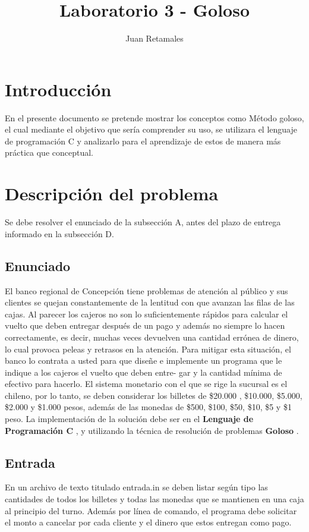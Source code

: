 \documentclass[9pt,twocolumn,twoside]{optica}
\title{Laboratorio 3 - Goloso}
\author{Juan Retamales}
\affil{Profesora: Mónica Villanueva}
\affil{Ayudante: Patricio Vargas}
\begin{document}
\maketitle

\section{Introducción}{
	\par{En}
     el presente documento se pretende mostrar los conceptos como Método goloso, el cual mediante el objetivo que sería comprender su uso, se utilizara el lenguaje de programación C y analizarlo para el aprendizaje de estos de manera más práctica que conceptual.
}

\section{Descripción del problema}
Se debe resolver el enunciado de la subsección A, antes del plazo de entrega informado en la subsección D.
\subsection{Enunciado}
El banco regional de Concepción tiene problemas de atención al público y
sus clientes se quejan constantemente de la lentitud con que avanzan las filas de
las cajas. Al parecer los cajeros no son lo suficientemente rápidos para calcular
el vuelto que deben entregar después de un pago y además no siempre lo hacen
correctamente, es decir, muchas veces devuelven una cantidad errónea de dinero,
lo cual provoca peleas y retrasos en la atención.
Para mitigar esta situación, el banco lo contrata a usted para que diseñe e
implemente un programa que le indique a los cajeros el vuelto que deben entre-
gar y la cantidad mínima de efectivo para hacerlo. El sistema monetario con el
que se rige la sucursal es el chileno, por lo tanto, se deben considerar los billetes
de \$20.000 , \$10.000, \$5.000, \$2.000 y \$1.000 pesos, además de las monedas de
\$500, \$100, \$50, \$10, \$5 y \$1 peso. La implementación de la solución debe ser
en el \textbf{Lenguaje de Programación C} , y utilizando la técnica de resolución de problemas \textbf{Goloso} \cite{actividad}.

\subsection{Entrada}
En un archivo de texto titulado
entrada.in
se deben listar según tipo las
cantidades de todos los billetes y todas las monedas que se mantienen en una
caja al principio del turno. Además por línea de comando, el programa debe
solicitar el monto a cancelar por cada cliente y el dinero que estos entregan como
pago.
\end{document}
